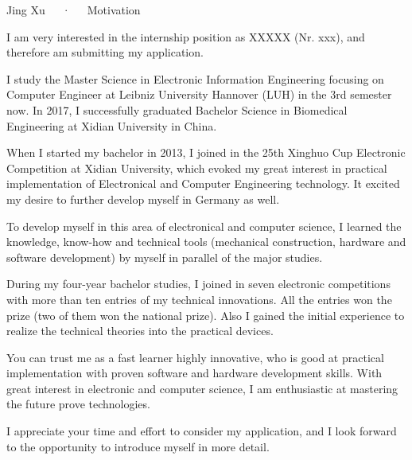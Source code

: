 \documentclass[11pt, a4paper]{awesome-cv}
\providecommand{\applicatename}{XXXXX (Nr. xxx)}
\begin{document}
\makecvheader[R]

\makecvfooter
  {}
  {Jing Xu~~~·~~~Motivation}
  {}

\makelettertitle

\begin{cvletter}

I am very interested in the internship position as \applicatename, and therefore am submitting my application.

I study the Master Science in Electronic Information Engineering focusing on Computer Engineer at Leibniz University Hannover (LUH) in the 3rd semester now. In 2017, I successfully graduated Bachelor Science in Biomedical Engineering at Xidian University in China. 

When I started my bachelor in 2013, I joined in the 25th Xinghuo Cup Electronic Competition at Xidian University, which evoked my great interest in practical implementation of Electronical and Computer Engineering technology. It excited my desire to further develop myself in Germany as well. 

To develop myself in this area of electronical and computer science, I learned the knowledge, know-how and technical tools (mechanical construction, hardware and software development) by myself in parallel of the major studies. 

During my four-year bachelor studies, I joined in seven electronic competitions with more than ten entries of my technical innovations. All the entries won the prize (two of them won the national prize). Also I gained the initial experience to realize the technical theories into the practical devices. 

You can trust me as a fast learner highly innovative, who is good at practical implementation with proven software and hardware development skills. With great interest in electronic and computer science, I am enthusiastic at mastering the future prove technologies. 

I appreciate your time and effort to consider my application, and I look forward to the opportunity to introduce myself in more detail. \\\\



\end{cvletter}


\makeletterclosing
\end{document}
